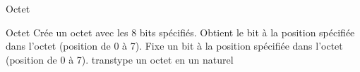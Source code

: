 \begin{tad}




    \begin{tadOperations}{Octet}
            {\tadParams{}}%
            {}
            {}%
            {}
            {}%
            {}
            {}%
            {\tadParams{\naturel}}
    \end{tadOperations}

    \begin{tadSemantiques}{Octet}
			{Crée un octet avec les 8 bits spécifiés.}%
			{Obtient le bit à la position spécifiée dans l'octet (position de 0 à 7).}
			{Fixe un bit à la position spécifiée dans l'octet (position de 0 à 7).}
            {transtype un octet en un naturel}
    \end{tadSemantiques}

    \begin{tadAxiomes}
    \end{tadAxiomes}

\end{tad}
